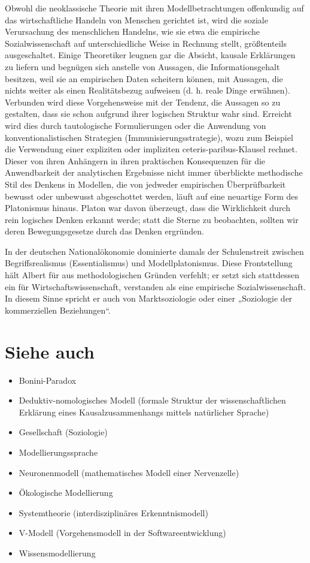 \documentclass[a4paper, 12pt]{scrartcl}
\begin{document}
Obwohl die neoklassische Theorie mit ihren Modellbetrachtungen offenkundig auf das wirtschaftliche Handeln von Menschen gerichtet ist, wird die soziale Verursachung des menschlichen Handelns, wie sie etwa die empirische Sozialwissenschaft auf unterschiedliche Weise in Rechnung stellt, größtenteils ausgeschaltet. Einige Theoretiker leugnen gar die Absicht, kausale Erklärungen zu liefern und begnügen sich anstelle von Aussagen, die Informationsgehalt besitzen, weil sie an empirischen Daten scheitern können, mit Aussagen, die nichts weiter als einen Realitätsbezug aufweisen (d. h. reale Dinge erwähnen). Verbunden wird diese Vorgehensweise mit der Tendenz, die Aussagen so zu gestalten, dass sie schon aufgrund ihrer logischen Struktur wahr sind. Erreicht wird dies durch tautologische Formulierungen oder die Anwendung von konventionalistischen Strategien (Immunisierungsstrategie), wozu zum Beispiel die Verwendung einer expliziten oder impliziten ceteris-paribus-Klausel rechnet. Dieser von ihren Anhängern in ihren praktischen Konsequenzen für die Anwendbarkeit der analytischen Ergebnisse nicht immer überblickte methodische Stil des Denkens in Modellen, die von jedweder empirischen Überprüfbarkeit bewusst oder unbewusst abgeschottet werden, läuft auf eine neuartige Form des Platonismus hinaus. Platon war davon überzeugt, dass die Wirklichkeit durch rein logisches Denken erkannt werde; statt die Sterne zu beobachten, sollten wir deren Bewegungsgesetze durch das Denken ergründen.

In der deutschen Nationalökonomie dominierte damals der Schulenstreit zwischen Begriffsrealismus (Essentialismus) und Modellplatonismus. Diese Frontstellung hält Albert für aus methodologischen Gründen verfehlt; er setzt sich stattdessen ein für Wirtschaftswissenschaft, verstanden als eine empirische Sozialwissenschaft. In diesem Sinne spricht er auch von Marktsoziologie oder einer „Soziologie der kommerziellen Beziehungen“.

\section{Siehe auch}

\begin{itemize}
    \item Bonini-Paradox
    \item Deduktiv-nomologisches Modell (formale Struktur der wissenschaftlichen Erklärung eines Kausalzusammenhangs mittels natürlicher Sprache)
    \item Gesellschaft (Soziologie)
    \item Modellierungssprache
    \item Neuronenmodell (mathematisches Modell einer Nervenzelle)
    \item Ökologische Modellierung
    \item Systemtheorie (interdisziplinäres Erkenntnismodell)
    \item V-Modell (Vorgehensmodell in der Softwareentwicklung)
    \item Wissensmodellierung
\end{itemize}
\end{document}
